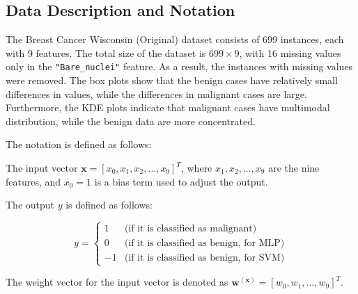 \subsection{Data Description and Notation}

The Breast Cancer Wisconsin (Original) dataset consists of 699 instances, each with 9 features. The total size of the dataset is \(699 \times 9\), with 16 missing values only in the \texttt{"Bare\_nuclei"} feature. As a result, the instances with missing values were removed. The box plots show that the benign cases have relatively small differences in values, while the differences in malignant cases are large. Furthermore, the KDE plots indicate that malignant cases have multimodal distribution, while the benign data are more concentrated.

The notation is defined as follows: 

The input vector \hbox{\(\mathbf{x} = [x_0, x_1, x_2, \ldots, x_9]^T\)}, where \(x_1, x_2, \ldots, x_9\) are the nine features, and \(x_0 = 1\) is a bias term used to adjust the output.

The output \(y\) is defined as follows:

\[
y = 
\begin{cases} 
1 & \text{(if it is classified as malignant)} \\
0 & \text{(if it is classified as benign, for MLP)} \\
-1 & \text{(if it is classified as benign, for SVM)}
\end{cases}
\]

The weight vector for the input vector is denoted as \hbox{\(\mathbf{w}^{(\mathbf{x})} = [w_0, w_1, \ldots, w_9]^T\)}.
